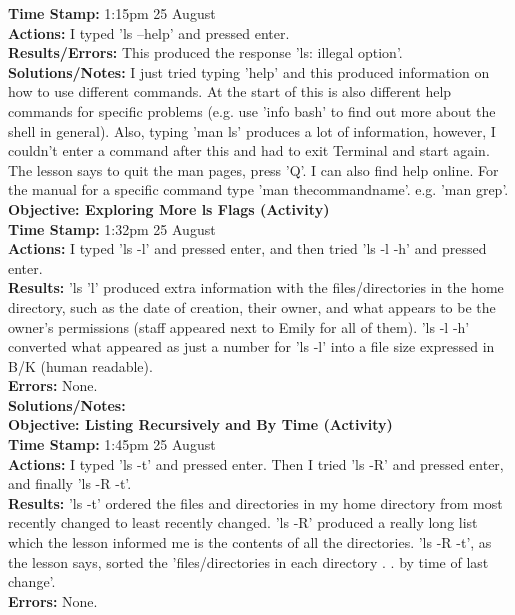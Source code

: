 \documentclass{article}
\begin{document}
\begin{FlushLeft}
\textbf{Time Stamp:} 1:15pm 25 August\\
\textbf{Actions:} I typed 'ls --help' and pressed enter.\\
\textbf{Results/Errors:} This produced the response 'ls: illegal option'.\\
\textbf{Solutions/Notes:} I just tried typing 'help' and this produced information on how to use different commands. At the start of this is also different help commands for specific problems (e.g. use 'info bash' to find out more about the shell in general). Also, typing 'man ls' produces a lot of information, however, I couldn't enter a command after this and had to exit Terminal and start again. The lesson says to quit the man pages, press 'Q'. I can also find help online. For the manual for a specific command type 'man thecommandname'. e.g. 'man grep'.\\
\vspace{5mm}
\textbf{Objective: Exploring More ls Flags (Activity)}\\ 
\textbf{Time Stamp:} 1:32pm 25 August\\
\textbf{Actions:} I typed 'ls -l' and pressed enter, and then tried 'ls -l -h' and pressed enter.\\
\textbf{Results:} 'ls 'l' produced extra information with the files/directories in the home directory, such as the date of creation, their owner, and what appears to be the owner's permissions (staff appeared next to Emily for all of them). 'ls -l -h' converted what appeared as just a number for 'ls -l' into a file size expressed in B/K (human readable).\\
\textbf{Errors:} None.\\
\textbf{Solutions/Notes:}\\
\vspace{5mm}
\textbf{Objective: Listing Recursively and By Time (Activity)}\\ 
\textbf{Time Stamp:} 1:45pm 25 August\\
\textbf{Actions:} I typed 'ls -t' and pressed enter. Then I tried 'ls -R' and pressed enter, and finally 'ls -R -t'.\\
\textbf{Results:} 'ls -t' ordered the files and directories in my home directory from most recently changed to least recently changed. 'ls -R' produced a really long list which the lesson informed me is the contents of all the directories. 'ls -R -t', as the lesson says, sorted the 'files/directories in each directory . . by time of last change'.\\
\textbf{Errors:} None.\\

\end{FlushLeft}
\end{document}
